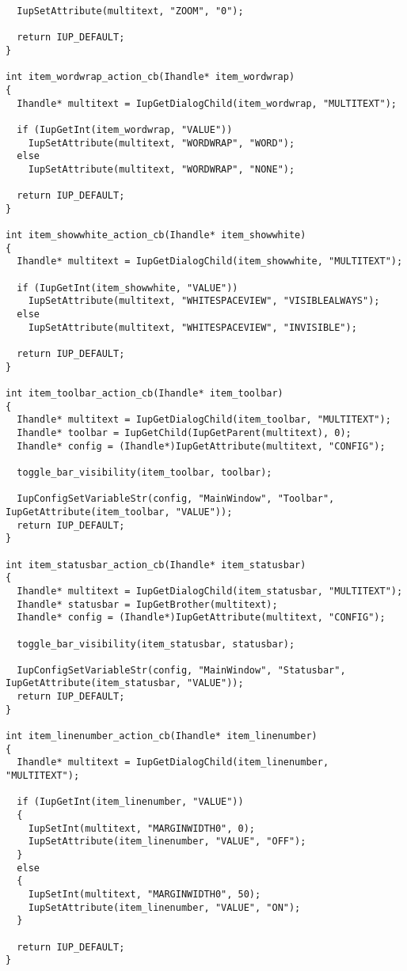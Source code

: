 \documentclass{ctexart}
\begin{document}
\begin{lstlisting}
  IupSetAttribute(multitext, "ZOOM", "0");

  return IUP_DEFAULT;
}

int item_wordwrap_action_cb(Ihandle* item_wordwrap)
{
  Ihandle* multitext = IupGetDialogChild(item_wordwrap, "MULTITEXT");

  if (IupGetInt(item_wordwrap, "VALUE"))
    IupSetAttribute(multitext, "WORDWRAP", "WORD");
  else
    IupSetAttribute(multitext, "WORDWRAP", "NONE");

  return IUP_DEFAULT;
}

int item_showwhite_action_cb(Ihandle* item_showwhite)
{
  Ihandle* multitext = IupGetDialogChild(item_showwhite, "MULTITEXT");

  if (IupGetInt(item_showwhite, "VALUE"))
    IupSetAttribute(multitext, "WHITESPACEVIEW", "VISIBLEALWAYS");
  else
    IupSetAttribute(multitext, "WHITESPACEVIEW", "INVISIBLE");

  return IUP_DEFAULT;
}

int item_toolbar_action_cb(Ihandle* item_toolbar)
{
  Ihandle* multitext = IupGetDialogChild(item_toolbar, "MULTITEXT");
  Ihandle* toolbar = IupGetChild(IupGetParent(multitext), 0);
  Ihandle* config = (Ihandle*)IupGetAttribute(multitext, "CONFIG");

  toggle_bar_visibility(item_toolbar, toolbar);

  IupConfigSetVariableStr(config, "MainWindow", "Toolbar", IupGetAttribute(item_toolbar, "VALUE"));
  return IUP_DEFAULT;
}

int item_statusbar_action_cb(Ihandle* item_statusbar)
{
  Ihandle* multitext = IupGetDialogChild(item_statusbar, "MULTITEXT");
  Ihandle* statusbar = IupGetBrother(multitext);
  Ihandle* config = (Ihandle*)IupGetAttribute(multitext, "CONFIG");

  toggle_bar_visibility(item_statusbar, statusbar);

  IupConfigSetVariableStr(config, "MainWindow", "Statusbar", IupGetAttribute(item_statusbar, "VALUE"));
  return IUP_DEFAULT;
}

int item_linenumber_action_cb(Ihandle* item_linenumber)
{
  Ihandle* multitext = IupGetDialogChild(item_linenumber, "MULTITEXT");

  if (IupGetInt(item_linenumber, "VALUE"))
  {
    IupSetInt(multitext, "MARGINWIDTH0", 0);
    IupSetAttribute(item_linenumber, "VALUE", "OFF");
  }
  else
  {
    IupSetInt(multitext, "MARGINWIDTH0", 50);
    IupSetAttribute(item_linenumber, "VALUE", "ON");
  }

  return IUP_DEFAULT;
}


\end{lstlisting}
\end{document}
